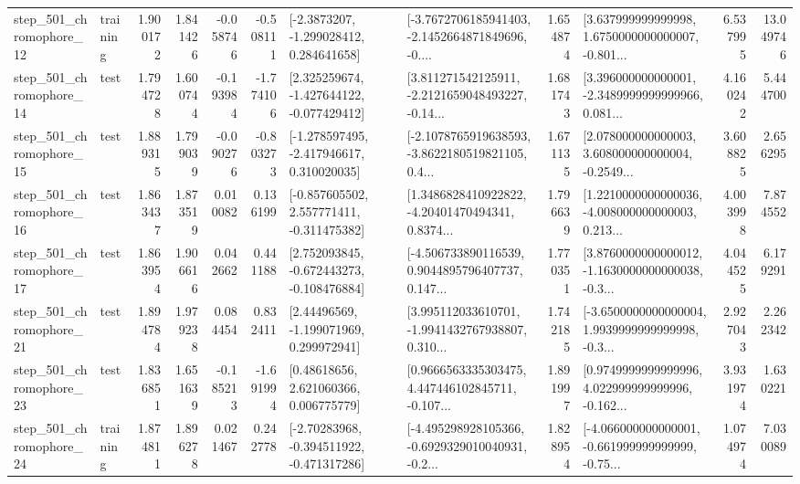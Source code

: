 \begin{tabular}{llrrrrllrlrr}
  step\_501\_chromophore\_12 &  training &      1.900172 &    1.841426 &     -0.058746 & -0.508111 &     [-2.3873207, -1.299028412, 0.284641658] &  [-3.7672706185941403, -2.1452664871849696, -0.... &       1.654874 &  [3.637999999999998, 1.6750000000000007, -0.801... &            6.537995 &         13.049746 \\
  step\_501\_chromophore\_14 &      test &      1.794728 &    1.600744 &     -0.193984 & -1.774106 &   [2.325259674, -1.427644122, -0.077429412] &  [3.811271542125911, -2.2121659048493227, -0.14... &       1.681743 &  [3.396000000000001, -2.3489999999999966, 0.081... &            4.160242 &          5.444700 \\
  step\_501\_chromophore\_15 &      test &      1.889315 &    1.799039 &     -0.090276 & -0.803273 &   [-1.278597495, -2.417946617, 0.310020035] &  [-2.1078765919638593, -3.8622180519821105, 0.4... &       1.671135 &  [2.078000000000003, 3.608000000000004, -0.2549... &            3.608825 &          2.656295 \\
  step\_501\_chromophore\_16 &      test &      1.863437 &    1.873519 &      0.010082 &  0.136199 &   [-0.857605502, 2.557771411, -0.311475382] &  [1.3486828410922822, -4.20401470494341, 0.8374... &       1.796639 &  [1.2210000000000036, -4.008000000000003, 0.213... &            4.003998 &          7.874552 \\
  step\_501\_chromophore\_17 &      test &      1.863954 &    1.906616 &      0.042662 &  0.441188 &   [2.752093845, -0.672443273, -0.108476884] &  [-4.506733890116539, 0.9044895796407737, 0.147... &       1.770351 &  [3.8760000000000012, -1.1630000000000038, -0.3... &            4.044525 &          6.179291 \\
  step\_501\_chromophore\_21 &      test &      1.894784 &    1.979238 &      0.084454 &  0.832411 &     [2.44496569, -1.199071969, 0.299972941] &  [3.995112033610701, -1.9941432767938807, 0.310... &       1.742185 &  [-3.6500000000000004, 1.9939999999999998, -0.3... &            2.927043 &          2.262342 \\
  step\_501\_chromophore\_23 &      test &      1.836851 &    1.651639 &     -0.185213 & -1.691994 &      [0.48618656, 2.621060366, 0.006775779] &  [0.9666563335303475, 4.447446102845711, -0.107... &       1.891997 &  [0.9749999999999996, 4.022999999999996, -0.162... &            3.931974 &          1.630221 \\
  step\_501\_chromophore\_24 &  training &      1.874811 &    1.896278 &      0.021467 &  0.242778 &   [-2.70283968, -0.394511922, -0.471317286] &  [-4.495298928105366, -0.6929329010040931, -0.2... &       1.828954 &  [-4.066000000000001, -0.661999999999999, -0.75... &            1.074974 &          7.030089 \\

\end{tabular}
